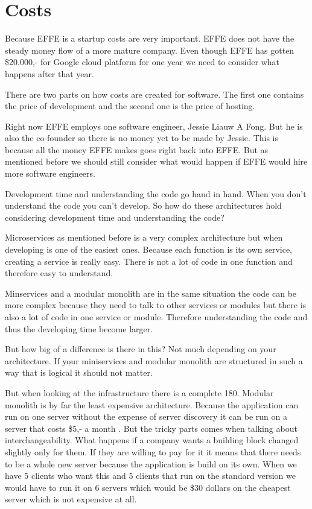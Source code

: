 \section{Costs}
\label{sec:Costs}

Because EFFE is a startup costs are very important. EFFE does not have the steady money flow of a more mature company. Even though EFFE has gotten \$20.000,- for Google cloud platform for one year we need to consider what happens after that year.

There are two parts on how costs are created for software. The first one contains the price of development and the second one is the price of hosting.

Right now EFFE employs one software engineer, Jessie Liauw A Fong. But he is also the co-founder so there is no money yet to be made by Jessie. This is because all the money EFFE makes goes right back into EFFE. But as mentioned before we should still consider what would happen if EFFE would hire more software engineers.

Development time and understanding the code go hand in hand. When you don’t understand the code you can’t develop. So how do these architectures hold considering development time and understanding the code?

Microservices as mentioned before is a very complex architecture but when developing is one of the easiest ones. Because each function is its own service, creating a service is really easy. There is not a lot of code in one function and therefore easy to understand.

Minservices and a modular monolith are in the same situation the code can be more complex because they need to talk to other services or modules but there is also a lot of code in one service or module. Therefore understanding the code and thus the developing time become larger.

But how big of a difference is there in this? Not much depending on your architecture. If your miniservices and modular monolith are structured in such a way that is logical it should not matter.

But when looking at the infrastructure there is a complete 180. Modular monolith is by far the least expensive architecture. Because the application can run on one server without the expense of server discovery it can be run on a server that costs \$5,- a month \cite{digitalOcean}. But the tricky parts comes when talking about interchangeability. What happens if a company wants a building block changed slightly only for them. If they are willing to pay for it it means that there needs to be a whole new server because the application is build on its own. When we have 5 clients who want this and 5 clients that run on the standard version we would have to run it on 6 servers which would be \$30 dollars on the cheapest server which is not expensive at all.

